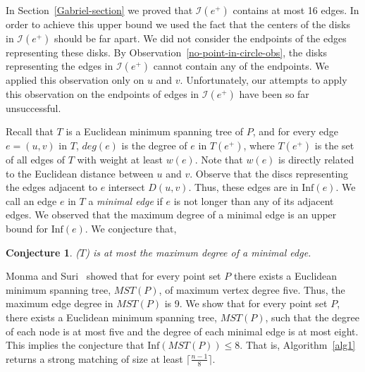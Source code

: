 \documentclass[11pt,a4paper]{article}
\newcommand{\dg}[1]{deg(#1)}
\newcommand{\Inf}[1]{\text{Inf}(#1)}
\newtheorem{conjecture}{Conjecture}
\begin{document}
In Section~\ref{Gabriel-section} we proved that $\mathcal{I}(e^+)$ contains at most 16 edges. In order to achieve this upper bound we used the fact that the centers of the disks in $\mathcal{I}(e^+)$ should be far apart. We did not consider the endpoints of the edges representing these disks. By Observation~\ref{no-point-in-circle-obs}, the disks representing the edges in $\mathcal{I}(e^+)$ cannot contain any of the endpoints. We applied this observation only on $u$ and $v$. Unfortunately, our attempts to apply this observation on the endpoints of edges in $\mathcal{I}(e^+)$ have been so far unsuccessful.

Recall that $T$ is a Euclidean minimum spanning tree of $P$, and for every edge $e=(u,v)$ in $T$, $\dg{e}$ is the degree of $e$ in $T(e^+)$, where $T(e^+)$ is the set of all edges of $T$ with weight at least $w(e)$. Note that $w(e)$ is directly related to the Euclidean distance between $u$ and $v$. Observe that the discs representing the edges adjacent to $e$ intersect $D(u,v)$. Thus, these edges are in $\Inf{e}$. 
We call an edge $e$ in $T$ a {\em minimal edge} if $e$ is not longer than any of its adjacent edges. We observed that the maximum degree of a minimal edge is an upper bound for $\Inf{e}$. We conjecture that,

\begin{conjecture}
{\em \Inf{$T$}} is at most the maximum degree of a minimal edge.
\end{conjecture}

Monma and Suri~\cite{Monma1992} showed that for every point set $P$ there exists a Euclidean minimum spanning tree, $MST(P)$, of maximum vertex degree five. Thus, the maximum edge degree in $MST(P)$ is 9. We show that for every point set $P$, there exists a Euclidean minimum spanning tree, $MST(P)$, such that the degree of each node is at most five and the degree of each minimal edge is at most eight. This implies the conjecture that $\Inf{MST(P)}\le 8$. That is, Algorithm~\ref{alg1} returns a strong matching of size at least $\lceil\frac{n-1}{8}\rceil$.
\end{document}
